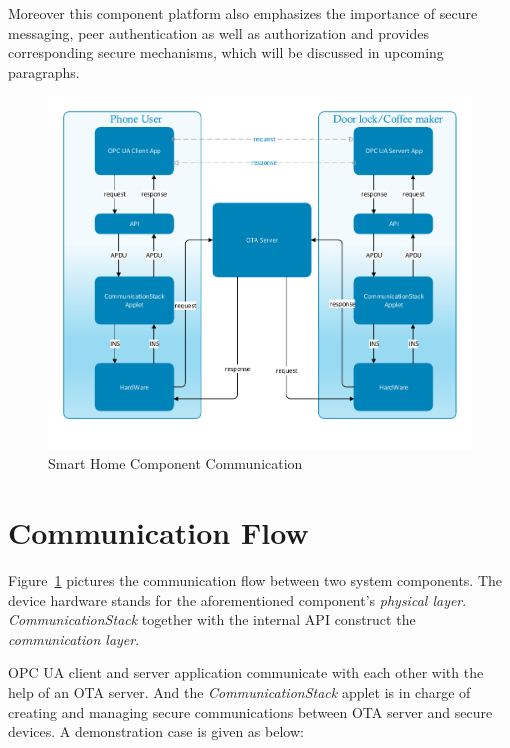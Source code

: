 Moreover this component platform also emphasizes the importance of secure messaging, peer authentication as well as authorization and provides corresponding secure mechanisms, which will be discussed in upcoming paragraphs.

 \begin{figure}[!htb]
	\centering
	\includegraphics[width=1\textwidth]{csoverview}
		\caption{Smart Home Component Communication}
	\label{fig:softwareStructure}
\end{figure}

\section{Communication Flow}
Figure~\ref{fig:softwareStructure} pictures the communication flow between two system components.
The device hardware stands for the aforementioned component's \emph{physical layer}. \emph{CommunicationStack} together with the {internal API} construct the \emph{communication layer}.  


OPC UA client and server application communicate with each other with the help of an OTA server. And the \emph{CommunicationStack} applet is in charge of creating and managing secure communications between OTA server and secure devices. A demonstration case is given as below:

